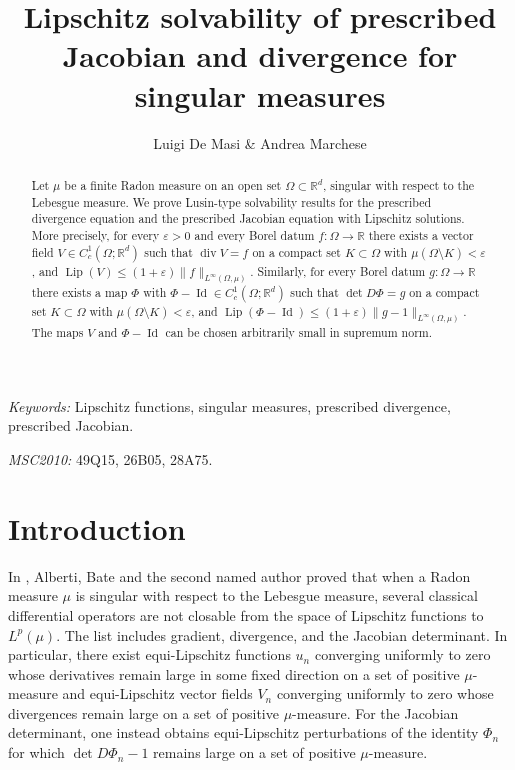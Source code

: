 \documentclass[11pt,a4paper]{article}
\title{Lipschitz solvability of prescribed Jacobian and divergence for singular measures}
\author{Luigi De Masi \& Andrea Marchese}
\date{}
\newcommand{\R}{\mathbb{R}}
\newcommand{\diver}{\operatorname{div}}
\newcommand{\Lip}{\operatorname{Lip}}
\newcommand{\Id}{\operatorname{Id}}
\theoremstyle{definition}
\theoremstyle{remark}
\begin{document}
\maketitle

\begin{abstract}
Let $\mu$ be a finite Radon measure on an open set $\Omega\subset\R^d$, singular with respect to the Lebesgue measure.
We prove Lusin-type solvability results for the prescribed divergence equation and the prescribed Jacobian equation with Lipschitz solutions.
More precisely, for every $\varepsilon>0$ and every Borel datum $f \colon \Omega \to \mathbb{R}$ there exists a vector field $V\in C^1_c(\Omega;\R^d)$ such that
$\diver V=f$
on a compact set $K\subset\Omega$ with $\mu(\Omega\setminus K)<\varepsilon$, and {$\Lip(V)\le (1+\varepsilon)\|f\|_{L^\infty(\Omega,\mu)}$}.
Similarly, for every Borel datum $g\colon \Omega \to \mathbb{R}$ there exists a map $\Phi$ with $\Phi-\Id\in C^1_c(\Omega;\R^d)$ such that
$\det D\Phi=g$
on a compact set $K\subset\Omega$ with $\mu(\Omega\setminus K)<\varepsilon$, and $\Lip(\Phi-\Id)\le (1+\varepsilon)\|g-1\|_{L^\infty(\Omega,\mu)}$.
The maps $V$ and $\Phi-\Id$ can be chosen arbitrarily small in supremum norm.
\end{abstract}

\medskip
\noindent\textit{Keywords:} Lipschitz functions, singular measures, prescribed divergence, prescribed Jacobian.

\noindent\textit{MSC2010:} 49Q15, 26B05, 28A75.

\section{Introduction}

In \cite[Corollary 1.5]{ABM}, Alberti, Bate and the second named author proved that when a Radon measure $\mu$ is singular with respect to the Lebesgue measure, several classical differential operators are not closable from the space of Lipschitz functions to $L^p(\mu)$. The list includes gradient, divergence, and the Jacobian determinant.
In particular, there exist equi-Lipschitz functions $u_n$ converging uniformly to zero whose derivatives remain large in some fixed direction on a set of positive $\mu$-measure and equi-Lipschitz vector fields $V_n$ converging uniformly to zero whose divergences remain large on a set of positive $\mu$-measure.
For the Jacobian determinant, one instead obtains equi-Lipschitz perturbations of the identity $\Phi_n$ for which $\det D\Phi_n-1$ remains large on a set of positive $\mu$-measure.
\end{document}
